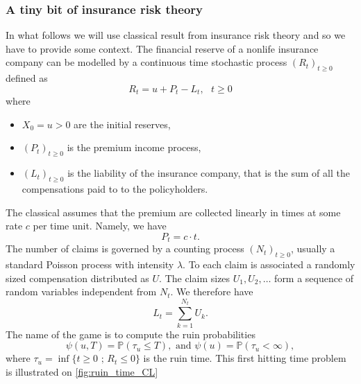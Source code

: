 \subsubsection{A tiny bit of insurance risk theory}\label{sssec:insurance_risk_theory}
In what follows we will use classical result from insurance risk theory and so we have to provide some context. The financial reserve of a nonlife insurance company can be modelled by a continuous time stochastic process $(R_t)_{t\geq0}$ defined as 
\begin{equation}\label{eq:risk_process}
R_t = u + P_t - L_t,\text{ }t\geq0
\end{equation}
where 
\begin{itemize}
  \item $X_0 = u>0$ are the initial reserves,
  \item $(P_t)_{t\geq0}$ is the premium income process,
  \item $(L_t)_{t\geq0}$ is the liability of the insurance company, that is the sum of all the compensations paid to to the policyholders.
\end{itemize}
The classical assumes that the premium are collected linearly in times at some rate $c$ per time unit. Namely, we have 
$$
P_t = c\cdot t.
$$
The number of claims is governed by a counting process $(N_t)_{t\geq0}$, usually a standard Poisson process with intensity $\lambda$. To each claim is associated a randomly sized compensation distributed as $U$. The claim sizes $U_1,U_2,\ldots$ form a sequence of \iid random variables independent from $N_t$. We therefore have 
$$
L_t = \sum_{k = 1}^{N_t}U_k.
$$
The name of the game is to compute the ruin probabilities 
\begin{equation}\label{eq:ruin_probabilities}
\psi(u,T) = \mathbb{P}(\tau_u \leq T),\text{ and }\psi(u) = \mathbb{P}(\tau_u < \infty),
\end{equation} 
where $\tau_u = \inf\{t\geq0\text{ ; }R_t \leq 0\}$ is the ruin time. This first hitting time problem is illustrated on \cref{fig:ruin_time_CL}
